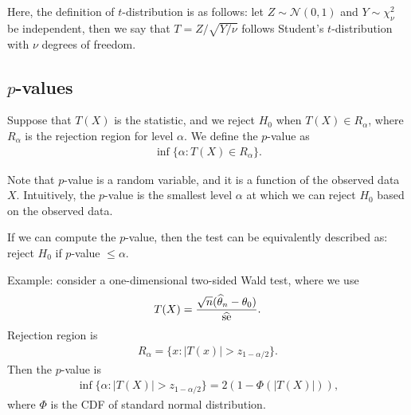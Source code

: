 \documentclass[11pt,letterpaper]{article}
\numberwithin{assumption}{lecture}
\numberwithin{theorem}{lecture}
\numberwithin{proposition}{lecture}
\numberwithin{lemma}{lecture}
\numberwithin{claim}{lecture}
\numberwithin{corollary}{lecture}
\numberwithin{definition}{lecture}
\numberwithin{conjecture}{lecture}
\numberwithin{remark}{lecture}
\numberwithin{example}{lecture}
\numberwithin{equation}{lecture}
\begin{document}
Here, the definition of $t$-distribution is as follows: let $Z \sim \mathcal{N} (0, 1)$ and $Y \sim \chi^2_\nu$ be independent, then we say that $T = Z / \sqrt{Y / \nu}$ follows Student's $t$-distribution with $\nu$ degrees of freedom.

\subsection{$p$-values}
\begin{definition}
  Suppose that $T(X)$ is the statistic, and we reject $H_0$ when $T(X) \in R_\alpha$, where $R_\alpha$ is the rejection region for level $\alpha$. We define the $p$-value as
  \begin{align*}
    \inf \{ \alpha: T(X) \in R_\alpha \}.
  \end{align*}
\end{definition}
Note that $p$-value is a random variable, and it is a function of the observed data $X$. Intuitively, the $p$-value is the smallest level $\alpha$ at which we can reject $H_0$ based on the observed data.

If we can compute the $p$-value, then the test can be equivalently described as: reject $H_0$ if $p$-value $\leq \alpha$.

Example: consider a one-dimensional two-sided Wald test, where we use
\begin{align*}
  T (X) = \frac{\sqrt{n} (\widehat{\theta}_n - \theta_0)}{\widehat{\mathrm{se}}}.
\end{align*}
Rejection region is
\begin{align*}
  R_\alpha = \{ x: |T(x)| > z_{1 - \alpha/2} \}.
\end{align*}
Then the $p$-value is
\begin{align*}
  \inf \{ \alpha: |T(X)| > z_{1 - \alpha/2} \} = 2 (1 - \Phi (|T(X)|)),
\end{align*}
where $\Phi$ is the CDF of standard normal distribution.
\end{document}
